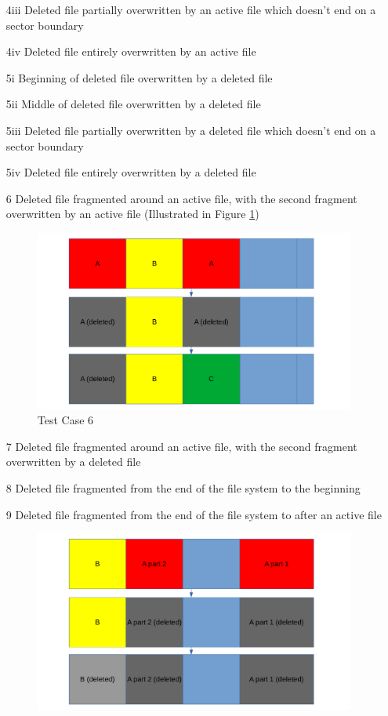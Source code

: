 \begin{itemize}
    \item [4iii] Deleted file partially overwritten by an active file which doesn't end on a sector boundary
    \item [4iv] Deleted file entirely overwritten by an active file
    \item [5i] Beginning of deleted file overwritten by a deleted file
    \item [5ii] Middle of deleted file overwritten by a deleted file
    \item [5iii] Deleted file partially overwritten by a deleted file which doesn't end on a sector boundary
    \item [5iv] Deleted file entirely overwritten by a deleted file
    \item [6] Deleted file fragmented around an active file, with the second fragment overwritten by an active file (Illustrated in Figure \ref{fig:case_6})
    \begin{figure}[h]
        \centering
        \includegraphics[width=\linewidth]{fig/case6.png}
        \caption{Test Case 6}
        \label{fig:case_6}
    \end{figure}
    \item [7] Deleted file fragmented around an active file, with the second fragment overwritten by a deleted file
    \item [8] Deleted file fragmented from the end of the file system to the beginning
    \item [9] Deleted file fragmented from the end of the file system to after an active file
    \begin{figure}[h]
        \centering
        \includegraphics[width=\linewidth]{fig/case10.png}

\end{figure}
\end{itemize}
